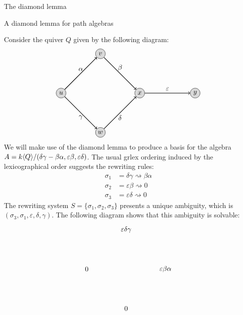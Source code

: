 \begin{chapter}{The diamond lemma}
\begin{section}{A diamond lemma for path algebras}
\begin{exmp} Consider the quiver $Q$ given by the following diagram:
\[
\begin{tikzpicture}[->,node distance=1cm, thick]
\tikzstyle{every node} = [circle, fill=gray!30, minimum size=.5cm, inner sep=.07cm, draw=black, thin]
\node (1) at (0,0) {$u$};
\node (2) at (2,2) {$v$};
\node (3) at (2,-2) {$w$};
\node (4) at (4,0) {$x$};
\node (5) at (6.82,0) {$y$};
\tikzstyle{every node} = []
\draw (1) -- (2) node[midway, above] {$\alpha$};
\draw (2) -- (4) node[midway, above] {$\beta$};
\draw (1) -- (3) node[midway, below] {$\gamma$};
\draw (3) -- (4) node[midway, below] {$\delta$};
\draw (4) -- (5) node[midway, above] {$\varepsilon$};
\end{tikzpicture}
\]
We will make use of the diamond lemma to produce a basis for the algebra $A=k\langle Q\rangle/(\delta\gamma-\beta\alpha, \varepsilon\beta, \varepsilon\delta)$. The usual grlex ordering induced by the lexicographical order suggests the rewriting rules:
\begin{align*}
\sigma_1 &= \delta\gamma \rightsquigarrow \beta\alpha\\
\sigma_2 &= \varepsilon\beta \rightsquigarrow 0\\
\sigma_3 &= \varepsilon\delta \rightsquigarrow 0
\end{align*}
The rewriting system $S=\{\sigma_1,\sigma_2,\sigma_3\}$ presents a unique ambiguity, which is $(\sigma_3,\sigma_1, \varepsilon,\delta,\gamma)$. The following diagram shows that this ambiguity is solvable:
\[
\begin{tikzpicture}
\node (1) at (0,0) {$\varepsilon\delta\gamma$};
\node (a1) at (-2,-2) {$0$};
\node (a2) at (2,-2) {$\varepsilon\beta\alpha$};
\node (b) at (0,-4) {$0$};


\end{tikzpicture}\]
\end{exmp}
\end{section}
\end{chapter}

